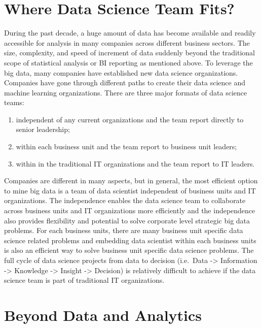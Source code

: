 \documentclass[12pt,]{krantz}
\providecommand{\tightlist}{%
  \setlength{\itemsep}{0pt}\setlength{\parskip}{0pt}}
\theoremstyle{definition}
\theoremstyle{definition}
\theoremstyle{remark}
\begin{document}
\section{Where Data Science Team
Fits?}\label{where-data-science-team-fits}

During the past decade, a huge amount of data has become available and
readily accessible for analysis in many companies across different
business sectors. The size, complexity, and speed of increment of data
suddenly beyond the traditional scope of statistical analysis or BI
reporting as mentioned above. To leverage the big data, many companies
have established new data science organizations. Companies have gone
through different paths to create their data science and machine
learning organizations. There are three major formats of data science
teams:

\begin{enumerate}
\def\labelenumi{(\arabic{enumi})}
\tightlist
\item
  independent of any current organizations and the team report directly
  to senior leadership;\\
\item
  within each business unit and the team report to business unit
  leaders;\\
\item
  within in the traditional IT organizations and the team report to IT
  leaders.
\end{enumerate}

Companies are different in many aspects, but in general, the most
efficient option to mine big data is a team of data scientist
independent of business units and IT organizations. The independence
enables the data science team to collaborate across business units and
IT organizations more efficiently and the independence also provides
flexibility and potential to solve corporate level strategic big data
problems. For each business units, there are many business unit specific
data science related problems and embedding data scientist within each
business units is also an efficient way to solve business unit specific
data science problems. The full cycle of data science projects from data
to decision (i.e.~Data -\textgreater{} Information -\textgreater{}
Knowledge -\textgreater{} Insight -\textgreater{} Decision) is
relatively difficult to achieve if the data science team is part of
traditional IT organizations.

\section{Beyond Data and Analytics}\label{beyond-data-and-analytics}
\end{document}
